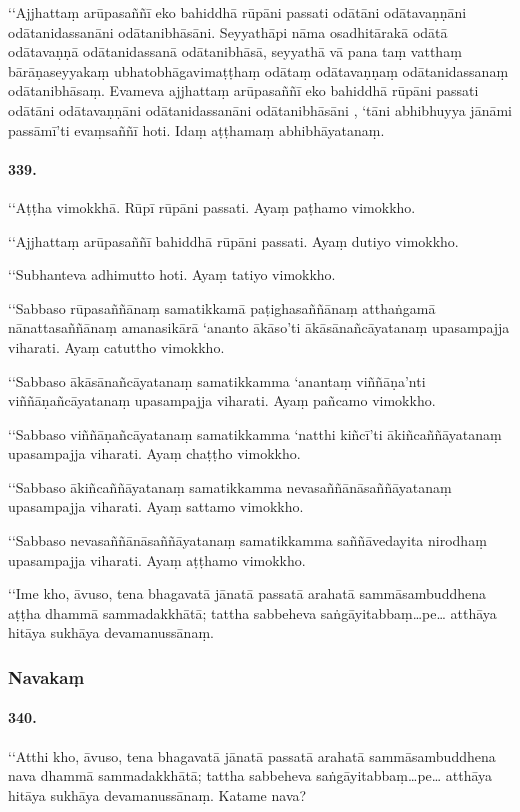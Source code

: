 ‘‘Ajjhattaṃ arūpasaññī eko bahiddhā rūpāni passati odātāni odātavaṇṇāni odātanidassanāni odātanibhāsāni. Seyyathāpi nāma osadhitārakā odātā odātavaṇṇā odātanidassanā odātanibhāsā, seyyathā vā pana taṃ vatthaṃ bārāṇaseyyakaṃ ubhatobhāgavimaṭṭhaṃ odātaṃ odātavaṇṇaṃ odātanidassanaṃ odātanibhāsaṃ. Evameva ajjhattaṃ arūpasaññī eko bahiddhā rūpāni passati odātāni odātavaṇṇāni odātanidassanāni odātanibhāsāni , ‘tāni abhibhuyya jānāmi passāmī’ti evaṃsaññī hoti. Idaṃ aṭṭhamaṃ abhibhāyatanaṃ.

\paragraph{339.} ‘‘Aṭṭha vimokkhā. Rūpī rūpāni passati. Ayaṃ paṭhamo vimokkho.

‘‘Ajjhattaṃ arūpasaññī bahiddhā rūpāni passati. Ayaṃ dutiyo vimokkho.

‘‘Subhanteva adhimutto hoti. Ayaṃ tatiyo vimokkho.

‘‘Sabbaso rūpasaññānaṃ samatikkamā paṭighasaññānaṃ atthaṅgamā nānattasaññānaṃ amanasikārā ‘ananto ākāso’ti ākāsānañcāyatanaṃ upasampajja viharati. Ayaṃ catuttho vimokkho.

‘‘Sabbaso ākāsānañcāyatanaṃ samatikkamma ‘anantaṃ viññāṇa’nti viññāṇañcāyatanaṃ upasampajja viharati. Ayaṃ pañcamo vimokkho.

‘‘Sabbaso viññāṇañcāyatanaṃ samatikkamma ‘natthi kiñcī’ti ākiñcaññāyatanaṃ upasampajja viharati. Ayaṃ chaṭṭho vimokkho.

‘‘Sabbaso ākiñcaññāyatanaṃ samatikkamma nevasaññānāsaññāyatanaṃ upasampajja viharati. Ayaṃ sattamo vimokkho.

‘‘Sabbaso nevasaññānāsaññāyatanaṃ samatikkamma saññāvedayita nirodhaṃ upasampajja viharati. Ayaṃ aṭṭhamo vimokkho.

‘‘Ime kho, āvuso, tena bhagavatā jānatā passatā arahatā sammāsambuddhena aṭṭha dhammā sammadakkhātā; tattha sabbeheva saṅgāyitabbaṃ…pe… atthāya hitāya sukhāya devamanussānaṃ.

\subsubsection{Navakaṃ}

\paragraph{340.} ‘‘Atthi kho, āvuso, tena bhagavatā jānatā passatā arahatā sammāsambuddhena nava dhammā sammadakkhātā; tattha sabbeheva saṅgāyitabbaṃ…pe… atthāya hitāya sukhāya devamanussānaṃ. Katame nava?

